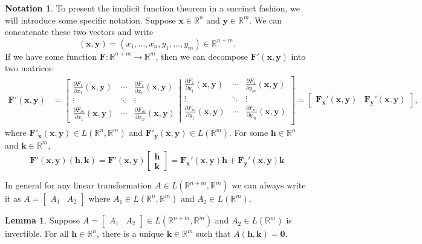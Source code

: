 \documentclass{article}
\newcommand{\R}{\mathbb{R}}
\newcommand{\x}{\mathbf{x}}
\newcommand{\F}{\mathbf{F}}
\newcommand{\y}{\mathbf{y}}
\newcommand{\h}{\mathbf{h}}
\newcommand{\ze}{\mathbf{0}}
\theoremstyle{definition}
\newtheorem{lemma}{Lemma}[section]
\newtheorem{note}{Notation}[section]
\begin{document}
\begin{note}
	To present the implicit function theorem in a succinct fashion, we will introduce some specific notation. Suppose $ \x \in \R^n $ and $ \y\in \R^m $. We can concatenate  these two vectors and write
	$$ (\x,\y)=(x_1,\ldots,x_n,y_1,\ldots,y_m) \in \R^{n+m}.$$ If we have some function $ \mathbf F:\R^{n+m}\to \R^m $, then 
	we can decompose $ \mathbf F'(\x,\y) $ into two matrices:
	\begin{align*}
		\mathbf F'(\x,\y) &= \left[{\begin{matrix}{\frac {\partial F_{1}}{\partial x_{1}}}(\mathbf {x} ,\mathbf {y} )&\cdots &{\frac {\partial F_{1}}{\partial x_{n}}}(\mathbf {x} ,\mathbf {y} )\\\vdots &\ddots &\vdots \\{\frac {\partial F_{m}}{\partial x_{1}}}(\mathbf {x} ,\mathbf {y} )&\cdots &{\frac {\partial F_{m}}{\partial x_{n}}}(\mathbf {x} ,\mathbf {y} )\end{matrix}}\right|\left.{\begin{matrix}{\frac {\partial F_{1}}{\partial y_{1}}}(\mathbf {x} ,\mathbf {y} )&\cdots &{\frac {\partial F_{1}}{\partial y_{m}}}(\mathbf {x} ,\mathbf {y} )\\\vdots &\ddots &\vdots \\{\frac {\partial F_{m}}{\partial y_{1}}}(\mathbf {x} ,\mathbf {y} )&\cdots &{\frac {\partial F_{m}}{\partial y_{m}}}(\mathbf {x} ,\mathbf {y} )\\\end{matrix}}\right] = \begin{bmatrix}
			\mathbf F_\x'(\x,\y) & \mathbf F_\y'(\x,\y) 
		\end{bmatrix},
	\end{align*}
where $ \F'_\x(\x,\y) \in L(\R^n,\R^m) $ and $ \F'_\y(\x,\y) \in L(\R^m) $. 
For some $ \h\in\R^n $ and $ \mathbf k\in\R^m $, 
$$  \mathbf F'(\x,\y)(\h,\mathbf k) = \mathbf F'(\x,\y) \begin{bmatrix}
	\h\\\mathbf k
\end{bmatrix} = \mathbf F_\x'(\x,\y)\h + \mathbf F_\y'(\x,\y)\mathbf k  $$
\end{note}
In general for any linear transformation $ A\in L(\R^{n+m},\R^{m}) $ we can always write it as $ A=\begin{bmatrix}A_1&A_2\end{bmatrix}$ where $ A_1\in L(\R^n,\R^m) $ and $ A_2\in L(\R^m) $. 
\begin{lemma}
	Suppose $ A=\begin{bmatrix}A_1&A_2\end{bmatrix}\in L(\R^{n+m},\R^m) $ and $ A_2\in L(\R^m) $ is invertible. For all $ \h\in\R^n $, there is a unique $ \mathbf k\in \R^m $ such that $ A(\h,\mathbf k)=\ze $.
\end{lemma}
\end{document}
